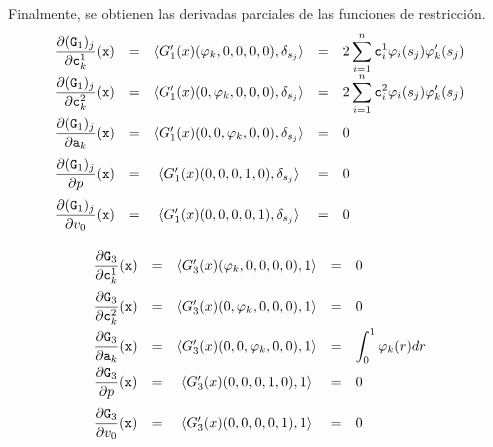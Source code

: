 \documentclass[a4paper,10pt]{book}
\begin{document}
Finalmente, se obtienen las derivadas parciales de las funciones de restricción.
\[
\begin{array}{ccccl}
\displaystyle\frac{\partial(\texttt{G}_1)_j}{\partial\texttt{c}^1_k}(\texttt{x})&=&\langle G'_1(x)(\varphi_k,0,0,0,0) , \delta_{s_j}\rangle&=&\displaystyle 2\sum_{i=1}^n\texttt{c}^{1}_i\varphi_i(s_j)\varphi_k'(s_j)\\
\displaystyle\frac{\partial(\texttt{G}_1)_j}{\partial\texttt{c}^2_k}(\texttt{x})&=&\langle G'_1(x)(0,\varphi_k,0,0,0) , \delta_{s_j}\rangle&=&\displaystyle 2\sum_{i=1}^n\texttt{c}^{2}_i\varphi_i(s_j)\varphi_k'(s_j)\\
\displaystyle\frac{\partial(\texttt{G}_1)_j}{\partial\texttt{a}_k}(\texttt{x})&=&\langle G'_1(x)(0,0,\varphi_k,0,0) , \delta_{s_j}\rangle&=&0\vphantom{\displaystyle\sum_{i=1}^n}\\
\displaystyle\frac{\partial(\texttt{G}_1)_j}{\partial p}(\texttt{x})&=& \langle G'_1(x)(0,0,0,1,0) , \delta_{s_j}\rangle&=&0\vphantom{\displaystyle\sum_{i=1}^n}\\
\displaystyle\frac{\partial(\texttt{G}_1)_j}{\partial v_0}(\texttt{x})&=&\langle G'_1(x)(0,0,0,0,1) , \delta_{s_j}\rangle&=&0\vphantom{\displaystyle\sum_{i=1}^n}
\end{array}
\]
\[
\begin{array}{ccccl}
\displaystyle\frac{\partial\texttt{G}_3}{\partial\texttt{c}^1_k}(\texttt{x})&=&\langle G'_3(x)(\varphi_k,0,0,0,0) , 1\rangle&=&0\vphantom{\displaystyle\sum_{i=1}^n}\\
\displaystyle\frac{\partial\texttt{G}_3}{\partial\texttt{c}^2_k}(\texttt{x})&=&\langle G'_3(x)(0,\varphi_k,0,0,0) , 1\rangle&=&0\vphantom{\displaystyle\sum_{i=1}^n}\\
\displaystyle\frac{\partial\texttt{G}_3}{\partial\texttt{a}_k}(\texttt{x})&=&\langle G'_3(x)(0,0,\varphi_k,0,0) , 1\rangle&=&\displaystyle \int_0^1\varphi_k(r)dr\\
\displaystyle\frac{\partial\texttt{G}_3}{\partial p}(\texttt{x})&=&\langle G'_3(x)(0,0,0,1,0) , 1\rangle&=&0\vphantom{\displaystyle\sum_{i=1}^n}\\
\displaystyle\frac{\partial\texttt{G}_3}{\partial v_0}(\texttt{x})&=&\langle G'_3(x)(0,0,0,0,1) , 1\rangle&=&0\vphantom{\displaystyle\sum_{i=1}^n}
\end{array}
\]
\end{document}

